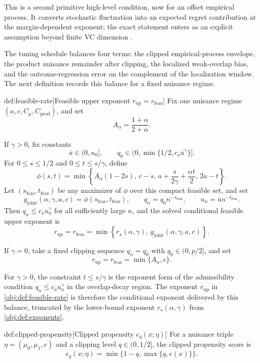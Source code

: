 \documentclass[11pt]{article}
\begin{document}
This is a second primitive high-level condition, now for an offset empirical process.  It converts stochastic fluctuation into an expected regret contribution at the margin-dependent exponent; the exact statement enters as an explicit assumption beyond finite VC dimension \citep{BartlettBousquetMendelson2005Local}.

The tuning schedule balances four terms: the clipped empirical-process envelope, the product nuisance remainder after clipping, the localized weak-overlap bias, and the outcome-regression error on the complement of the localization window.  The next definition records this balance for a fixed nuisance regime.

\begin{definitionv}{def:feasible-rate}[Feasible upper exponent $r_{\mathrm{up}}=r_{\mathrm{feas}}$]
Fix one nuisance regime \((a,c,C_\mu,C_{\mathrm{prod}})\), and set
\[
A_\alpha=\frac{1+\alpha}{2+\alpha}.
\]

If \(\gamma>0\), fix constants
\[
\bar u\in(0,u_0],
\qquad
q_0\in\bigl(0,\min\{1/2,c_o\bar u^\gamma\}\bigr].
\]
For \(0\le s\le 1/2\) and \(0\le t\le s/\gamma\), define
\[
\phi(s,t)
=
\min\left\{
A_\alpha(1-2s),\,
c-s,\,
a+\frac{s}{2\gamma}+\frac{\alpha t}{2},\,
2a-t
\right\}.
\]
Let \((s_{\mathrm{feas}},t_{\mathrm{feas}})\) be any maximizer of \(\phi\) over this compact feasible set, and set
\[
g_{\mathrm{joint}}(\alpha,\gamma,a,c)
=
\phi(s_{\mathrm{feas}},t_{\mathrm{feas}}),
\qquad
q_n=q_0 n^{-s_{\mathrm{feas}}},
\qquad
u_n=\bar u n^{-t_{\mathrm{feas}}}.
\]
Then \(q_n\le c_o u_n^\gamma\) for all sufficiently large \(n\), and the solved conditional feasible upper exponent is
\[
r_{\mathrm{up}}
=
r_{\mathrm{feas}}
=
\min\left\{r_\star(\alpha,\gamma),\,g_{\mathrm{joint}}(\alpha,\gamma,a,c)\right\}.
\]

If \(\gamma=0\), take a fixed clipping sequence \(q_n=q_0\) with \(q_0\in(0,\underline p/2]\), and set
\[
r_{\mathrm{up}}
=
r_{\mathrm{feas}}
=
\min\{A_\alpha,c\}.
\]
\end{definitionv}

For \(\gamma>0\), the constraint \(t\le s/\gamma\) is the exponent form of the admissibility condition \(q_n\le c_o u_n^\gamma\) in the overlap-decay region.  The exponent \(r_{\mathrm{up}}\) in \cref{obj:def:feasible-rate} is therefore the conditional exponent delivered by this balance, truncated by the lower-bound exponent \(r_\star(\alpha,\gamma)\) from \cref{obj:def:exponents}.

\begin{definitionv}{def:clipped-propensity}[Clipped propensity $e_q(x;\eta)$]
For a nuisance triple \(\eta=(\mu_0,\mu_1,e)\) and a clipping level \(q\in(0,1/2]\), the clipped propensity score is
\[
e_q(x;\eta)
=
\min\{1-q,\max\{q,e(x)\}\}.
\]
\end{definitionv}
\end{document}
